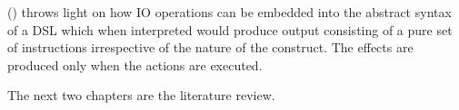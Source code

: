\documentclass[thesis-solanki.tex]{subfiles}
\begin{document}
() throws light on how IO operations can be embedded into the abstract syntax
of a DSL which when interpreted would produce output consisting of a pure set of instructions irrespective of the
nature of the construct.
The effects are produced only when the actions are executed.

\begin{comment}
\section{Thesis Improved Contributions}\label{sec:thes-impr-contr}

\begin{enumerate}
\item Prototype 1 does
flattening language
opening up the language (binding monad)
adding custom variables
monadic unification (stuff happens in a bubble)
rec type $\rightarrow$ non rec type $\rightarrow$ fix non rec type isomorphically == rec type

You can make an Flatterm int

but you cannot make term int

adding quantifiers


\item Prototype 2 does
extends current prolog-0.2.0.1
this is to show that we can plug out approach into existing implementation and things work

\item Prototype 3 does
variable search strategy
what ever method you do for searching at the point of unification you can do it with our approach

\item Prototype 4 does
how can io be squeezed into this model where whenever the resolver encounters an io operation it generates a thunk (sort of unsolved
statement) which when executed would result in a side effect but till that point every thing is pure

\end{enumerate}
\end{comment}

The next two chapters are the literature review.

\ifMain\ifDraft
\begin{scope}
  \nolinenumbers
  \enotesize
  \par
  \begin{singlespace}
  \setlength{\parskip}{12pt plus 2pt minus 1pt}
  \theendnotes
  \par
  \end{singlespace}
\end{scope}
\fi\fi
\end{document}
